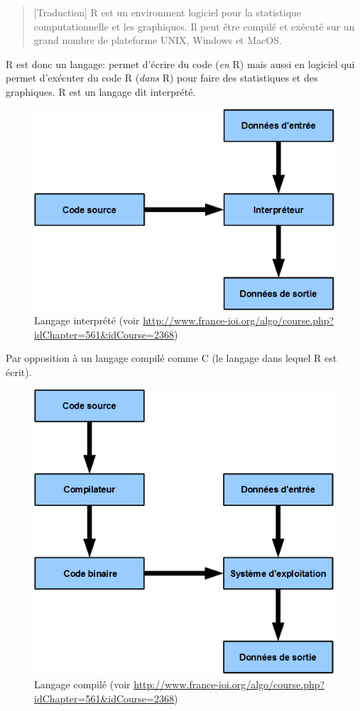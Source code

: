 \documentclass[]{article}
\begin{document}
\begin{quote}
{[}Traduction{]} R est un environment logiciel pour la statistique computationnelle et les graphiques. Il peut être compilé et exécuté sur un grand nombre de plateforme UNIX, Windows et MacOS.
\end{quote}

R est donc un langage: permet d'écrire du code (\emph{en} R) mais aussi en logiciel qui permet d'exécuter du code R (\emph{dans} R) pour faire des statistiques et des graphiques.
R est un langage dit interprété.

\begin{figure}
\centering
\includegraphics{img/chap2/schema_interpreted_FR.png}
\caption{Langage interprété (voir \url{http://www.france-ioi.org/algo/course.php?idChapter=561\&idCourse=2368})}
\end{figure}

Par opposition à un langage compilé comme C (le langage dans lequel R est écrit).

\begin{figure}
\centering
\includegraphics{img/chap2/schema_compiled_FR.png}
\caption{Langage compilé (voir \url{http://www.france-ioi.org/algo/course.php?idChapter=561\&idCourse=2368})}
\end{figure}
\end{document}
